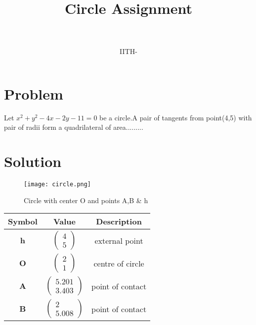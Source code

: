 \documentclass[journal,10pt,twocolumn]{article}
\title{Circle Assignment}
\date{}
\author{\myauthor\hspace{1em}\\\contact\\IITH\hspace{0.5em}-\hspace{0.5em}\mymodule}
\let\vec\mathbf
\begin{document}
\maketitle
\section*{Problem}
Let $x^2+y^2-4x-2y-11=0$ be a circle.A pair of tangents from point(4,5) with pair of radii form a quadrilateral of area.........
\section*{Solution}

\begin{figure}[h]
\centering
\texttt{[image: circle.png]}
\caption{Circle with center O and points A,B \& h}
\label{fig:Circle}
\end{figure}
\begin{tabular}{|c|c|c|}
  \hline
  \textbf{Symbol}&\textbf{Value}&\textbf{Description}\\
  \hline
  $\vec{h}$&$\begin{pmatrix}
  4\\5
  \end{pmatrix}$&  external point\\
  \hline
  $\vec{O}$&$\begin{pmatrix}
  2\\1
  \end{pmatrix}$&centre of circle\\
  \hline
  $\vec{A}$&$\begin{pmatrix}
  5.201\\3.403
  \end{pmatrix}$& point of contact\\
  \hline
  $\vec{B}$&$\begin{pmatrix}
  2\\5.008
  \end{pmatrix}$& point of contact\\
  \hline
  
\end{tabular}
\end{document}
